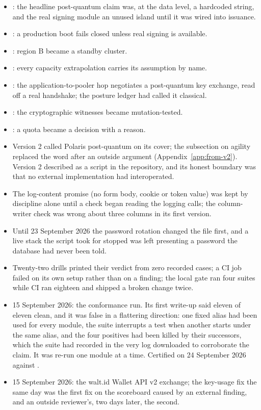 \begin{itemize}
  \item {}: the headline post-quantum claim was, at the data level, a hardcoded string, and
    the real signing module an unused island until it was wired into issuance.
  \item {}: a production boot fails closed unless real signing is available.
  \item {}: region B became a standby cluster.
  \item {}: every capacity extrapolation carries its assumption by name.
  \item {}: the application-to-pooler hop negotiates a post-quantum key exchange, read off a
    real handshake; the posture ledger had called it classical.
  \item {}: the cryptographic witnesses became mutation-tested.
  \item {}: a quota became a decision with a reason.
  \item Version 2 called Polaris post-quantum on its cover; the subsection on agility replaced the word
    after an outside argument (Appendix~\ref{app:from-v2}). Version 2 described 
    as a script in the repository, and its honest boundary was that no external implementation had
    interoperated.
  \item The log-content promise (no form body, cookie or token value) was kept by discipline alone
    until a check began reading the logging calls; the column-writer check was wrong about three
    columns in its first version.
  \item Until 23 September 2026 the password rotation changed the file first, and a live stack the
    script took for stopped was left presenting a password the database had never been told.
  \item Twenty-two drills printed their verdict from zero recorded cases; a CI job failed on its own
    setup rather than on a finding; the local gate ran four suites while CI ran eighteen and shipped a
    broken change twice.
\end{itemize}

\begin{itemize}
  \item 15 September 2026: the conformance run. Its first write-up said eleven of eleven clean, and it
    was false in a flattering direction: one fixed alias had been used for every module, the suite
    interrupts a test when another starts under the same alias, and the four positives had been killed
    by their successors, which the suite had recorded in the very log downloaded to corroborate the
    claim. It was re-run one module at a time. Certified on 24 September 2026 against
    .
  \item 15 September 2026: the walt.id Wallet API v2 exchange; the key-usage fix the same day was the
    first fix on the scoreboard caused by an external finding, and an outside reviewer's, two days
    later, the second.
\end{itemize}

